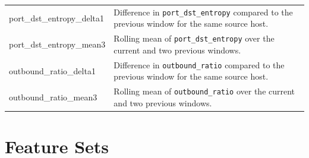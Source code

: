 \begin{longtable}{
    >{\ttfamily\raggedright\arraybackslash}p{}
    >{\raggedright\arraybackslash}p{}
}
port\_dst\_entropy\_delta1 & Difference in \texttt{port\_dst\_entropy} compared to the previous window for the same source host. \\
port\_dst\_entropy\_mean3 & Rolling mean of \texttt{port\_dst\_entropy} over the current and two previous windows. \\

outbound\_ratio\_delta1 & Difference in \texttt{outbound\_ratio} compared to the previous window for the same source host. \\
outbound\_ratio\_mean3 & Rolling mean of \texttt{outbound\_ratio} over the current and two previous windows. \\

\end{longtable}



\section{Feature Sets}
\label{app:feature_sets}

